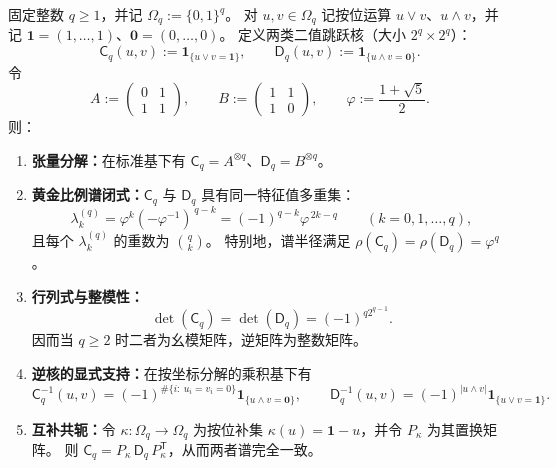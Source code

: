 \begin{theorem}[布尔二值跳跃核的张量谱与互补反演]\label{thm:xi-boolean-binary-jump-kernels-tensor-spectrum}
固定整数 \(q\ge 1\)，并记 \(\Omega_q:=\{0,1\}^q\)。
对 \(u,v\in\Omega_q\) 记按位运算 \(u\vee v\)、\(u\wedge v\)，并记 \(\mathbf{1}=(1,\dots,1)\)、\(\mathbf{0}=(0,\dots,0)\)。
定义两类二值跳跃核（大小 \(2^q\times 2^q\)）：
\[
\mathsf{C}_q(u,v):=\mathbf{1}_{\{u\vee v=\mathbf{1}\}},
\qquad
\mathsf{D}_q(u,v):=\mathbf{1}_{\{u\wedge v=\mathbf{0}\}}.
\]
令
\[
A:=\begin{pmatrix}0&1\\[2pt]1&1\end{pmatrix},
\qquad
B:=\begin{pmatrix}1&1\\[2pt]1&0\end{pmatrix},
\qquad
\varphi:=\frac{1+\sqrt5}{2}.
\]
则：
\begin{enumerate}
  \item \textbf{张量分解：}在标准基下有 \(\mathsf{C}_q=A^{\otimes q}\)、\(\mathsf{D}_q=B^{\otimes q}\)。
  \item \textbf{黄金比例谱闭式：}\(\mathsf{C}_q\) 与 \(\mathsf{D}_q\) 具有同一特征值多重集：
  \[
  \lambda_k^{(q)}=\varphi^k(-\varphi^{-1})^{\,q-k}=(-1)^{q-k}\varphi^{\,2k-q}\qquad(k=0,1,\dots,q),
  \]
  且每个 \(\lambda_k^{(q)}\) 的重数为 \(\binom{q}{k}\)。
  特别地，谱半径满足 \(\rho(\mathsf{C}_q)=\rho(\mathsf{D}_q)=\varphi^q\)。
  \item \textbf{行列式与整模性：}
  \[
  \det(\mathsf{C}_q)=\det(\mathsf{D}_q)=(-1)^{q2^{q-1}}.
  \]
  因而当 \(q\ge 2\) 时二者为幺模矩阵，逆矩阵为整数矩阵。
  \item \textbf{逆核的显式支持：}在按坐标分解的乘积基下有
  \[
  \mathsf{C}_q^{-1}(u,v)=(-1)^{\#\{i:\ u_i=v_i=0\}}\mathbf{1}_{\{u\wedge v=\mathbf{0}\}},
  \qquad
  \mathsf{D}_q^{-1}(u,v)=(-1)^{|u\wedge v|}\mathbf{1}_{\{u\vee v=\mathbf{1}\}}.
  \]
  \item \textbf{互补共轭：}令 \(\kappa:\Omega_q\to\Omega_q\) 为按位补集 \(\kappa(u)=\mathbf{1}-u\)，并令 \(P_\kappa\) 为其置换矩阵。
  则 \(\mathsf{C}_q=P_\kappa\,\mathsf{D}_q\,P_\kappa^{\mathsf T}\)，从而两者谱完全一致。
\end{enumerate}
\end{theorem}
